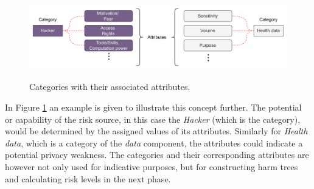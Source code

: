 \begin{figure}[hbt!]
  \centering
  \includegraphics[width=\textwidth]{pictures/cat_att.png}
  \caption{}{Categories with their associated attributes.}
  \label{fig:cat_att}
\end{figure}

In Figure \ref{fig:cat_att} an example is given to illustrate this concept
further. The potential or capability of the risk source, in this case the
\textit{Hacker} (which is the category), would be determined by the assigned
values of its attributes. Similarly for \textit{Health data}, which is a
category of the \textit{data} component, the attributes could indicate a
potential privacy weakness. The categories and their corresponding attributes
are however not only used for indicative purposes, but for constructing harm
trees and calculating risk levels in the next phase.

